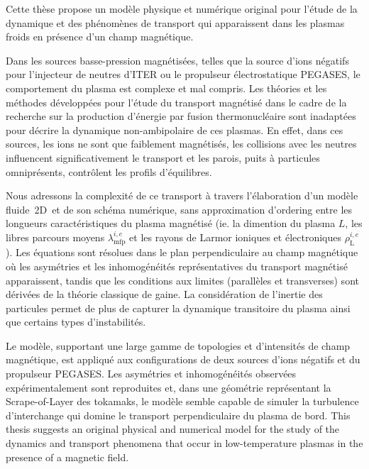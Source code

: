 \thispagestyle{preface}
		Cette thèse propose un modèle physique et numérique original pour l'étude de
		la dynamique et des phénomènes de transport qui apparaissent dans les plasmas
		froids en présence d'un champ magnétique. 
		
		Dans les sources basse-pression magnétisées, telles que la source d'ions
		négatifs pour l'injecteur de neutres d'ITER ou le propulseur électrostatique
		PEGASES, le comportement du plasma est complexe et mal compris.
		Les théories et les méthodes développées pour l'étude du transport magnétisé dans le cadre de la recherche
		sur la production d'énergie par fusion thermonucléaire sont inadaptées
		pour décrire la dynamique non-ambipolaire de ces plasmas. En effet, dans ces
		sources, les ions ne sont que faiblement magnétisés, les collisions avec les
		neutres influencent significativement le transport et les
		parois, puits à particules omniprésents, contrôlent les profils d'équilibres.
		
		Nous adressons la complexité de ce transport à travers l’élaboration d'un
		modèle fluide~2D\textonehalf ~et de son schéma numérique, sans approximation
		d'ordering entre les longueurs caractéristiques du plasma magnétisé (ie. la
		dimention du plasma $L$, les libres parcours moyens $\lambda_\text{mfp}^{i,e}$
		et les rayons de Larmor ioniques et électroniques 
		$\rho_\text{L}^{i,e}$).
		Les équations sont résolues dans le plan perpendiculaire au champ magnétique
		où les asymétries et les inhomogénéités représentatives du transport magnétisé
		apparaissent, tandis que les conditions aux limites (parallèles et
		transverses) sont dérivées de la théorie classique de gaine. La considération
		de l'inertie des particules permet de plus de capturer la dynamique
		transitoire du plasma ainsi que certains types d'instabilités.
		
		Le modèle, supportant une large gamme de topologies et d'intensités de champ
		magnétique, est appliqué aux configurations de deux sources d'ions négatifs et
		du propulseur PEGASES. Les asymétries et inhomogénéités observées
		expérimentalement sont reproduites et, dans une géométrie représentant la
		Scrape-of-Layer des tokamaks, le modèle semble capable de simuler
		la turbulence d'interchange qui domine le transport perpendiculaire du
		plasma de bord.
		\newpage
		\thispagestyle{empty}
		\cleardoublepage
		\thispagestyle{preface}	
		This thesis suggests an original physical and numerical model for the study
		of the dynamics and transport phenomena that occur in low-temperature plasmas
		in the presence of a magnetic field.

